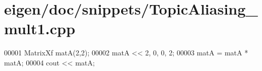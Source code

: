 \hypertarget{eigen_2doc_2snippets_2_topic_aliasing__mult1_8cpp_source}{}\section{eigen/doc/snippets/\+Topic\+Aliasing\+\_\+mult1.cpp}
\label{eigen_2doc_2snippets_2_topic_aliasing__mult1_8cpp_source}

\begin{DoxyCode}
00001 MatrixXf matA(2,2); 
00002 matA << 2, 0,  0, 2;
00003 matA = matA * matA;
00004 cout << matA;
\end{DoxyCode}
